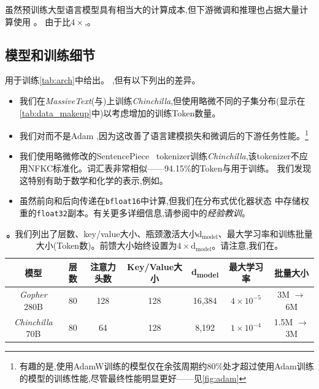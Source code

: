 \documentclass[11pt, a4paper, logo, copyright, nonumbering]{deepmind}
\newcommand{\massivetext}{\textit{MassiveText}\xspace}
\newcommand{\gopher}{\textit{Gopher}\xspace}
\newcommand{\chinchilla}{\textit{Chinchilla}\xspace}
\begin{document}
虽然预训练大型语言模型具有相当大的计算成本,但下游微调和推理也占据大量计算使用 \citep{rae2021gopher}。
由于比$4 \times$,。

\subsection{模型和训练细节}
\label{method:models}
用于训练\autoref{tab:arch}中给出。
,但有以下列出的差异。
\begin{itemize}
    \item 我们在\massivetext(与)上训练\chinchilla,但使用略微不同的子集分布(显示在\autoref{tab:data_makeup}中)以考虑增加的训练Token数量。
    \item 我们对 \citep{loshchilov2018decoupled}而不是Adam \citep{kingma2014adam},因为这改善了语言建模损失和微调后的下游任务性能。\footnote{有趣的是,使用AdamW训练的模型仅在余弦周期约80\%处才超过使用Adam训练的模型的训练性能,尽管最终性能明显更好——见\autoref{fig:adam}}
    \item 我们使用略微修改的SentencePiece~\citep{kudo2018sentencepiece} tokenizer训练\chinchilla,该tokenizer不应用NFKC标准化。词汇表非常相似——94.15\%的Token与用于训练。
    我们发现这特别有助于数学和化学的表示,例如。
    \item 虽然前向和后向传递在\texttt{bfloat16}中计算,但我们在分布式优化器状态 \citep{rajbhandari2020zero}中存储权重的\texttt{float32}副本。有关更多详细信息,请参阅\citet{rae2021gopher}中的\textit{经验教训}。
\end{itemize}

\begin{table}[b]
    \centering
    \begin{tabular}{ccccccc}
    \toprule
        \textbf{模型} & \textbf{层数} & \textbf{注意力头数} & \textbf{Key/Value大小} & \textbf{d\textsubscript{model}} & \textbf{最大学习率}  & \textbf{批量大小} \\ 
        \midrule
         \gopher 280B & 80 & 128 & 128 & 16,384 & $4 \times 10^{-5}$ & 3M $\rightarrow$ 6M\\ 
         \chinchilla 70B & 80 & 64 & 128 & 8,192 & $1 \times 10^{-4}$ & 1.5M $\rightarrow$ 3M\\ 
         \bottomrule
    \end{tabular}
    \caption{\textbf{。}我们列出了层数、key/value大小、瓶颈激活大小d$_{\text{model}}$、最大学习率和训练批量大小(Token数)。前馈大小始终设置为$4\times \textrm{d}_{\textrm{model}}$。请注意,我们在。}
    \label{tab:arch}
\end{table}
\end{document}
